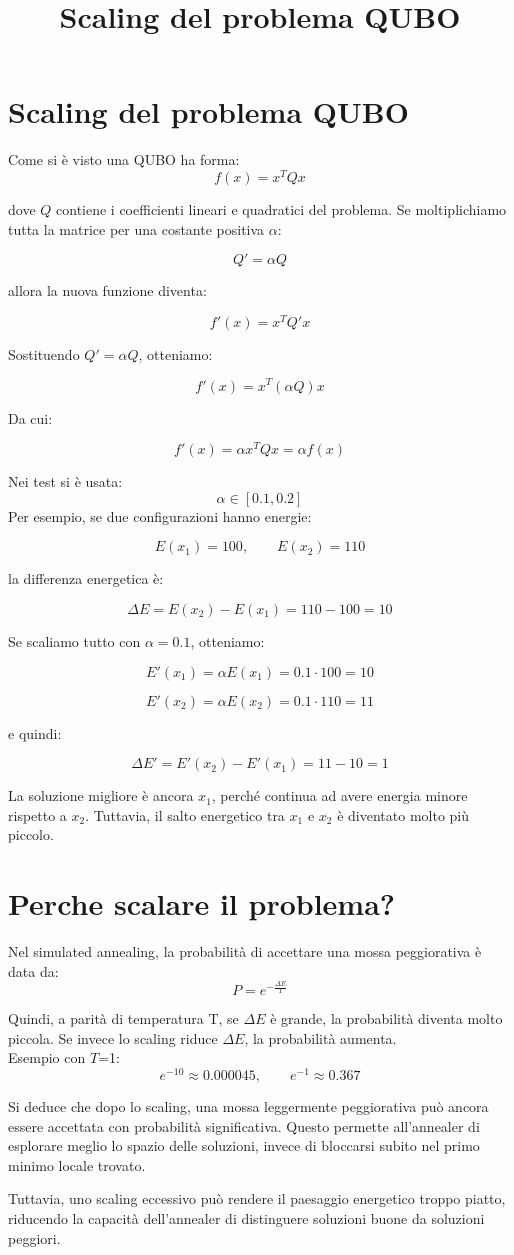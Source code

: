 \documentclass[a4paper,12pt]{article}
\title{Scaling del problema QUBO}
\author{}
\begin{document}
\maketitle
\newpage

\section{Scaling del problema QUBO}
Come si è visto una QUBO ha forma:
\[
f(x) = x^T Q x
\]

dove \(Q\) contiene i coefficienti lineari e quadratici del problema.  
Se moltiplichiamo tutta la matrice per una costante positiva \(\alpha\):

\[
Q' = \alpha Q
\]

allora la nuova funzione diventa:

\[
f'(x) = x^T Q' x
\]

Sostituendo \(Q' = \alpha Q\), otteniamo:

\[
f'(x) = x^T (\alpha Q) x
\]

Da cui:

\[
f'(x) = \alpha x^T Q x = \alpha f(x)
\]

Nei test si è usata: 
\[
\alpha \in [0.1, 0.2]
\]
\[\]
Per esempio, se due configurazioni hanno energie:

\[
E(x_1) = 100, \qquad E(x_2) = 110
\]

la differenza energetica è:

\[
\Delta E = E(x_2) - E(x_1) = 110 - 100 = 10
\]

Se scaliamo tutto con \(\alpha = 0.1\), otteniamo:

\[
E'(x_1) = \alpha E(x_1) = 0.1 \cdot 100 = 10
\]

\[
E'(x_2) = \alpha E(x_2) = 0.1 \cdot 110 = 11
\]

e quindi:

\[
\Delta E' = E'(x_2) - E'(x_1) = 11 - 10 = 1
\]

La soluzione migliore è ancora \(x_1\), perché continua ad avere energia minore 
rispetto a \(x_2\). Tuttavia, il salto energetico tra \(x_1\) e \(x_2\) è diventato 
molto più piccolo.

\section{Perche scalare il problema?}
Nel simulated annealing, la probabilità di accettare una mossa peggiorativa è data da:
\[
P = e^{-\frac{\Delta E}{T}}
\]

Quindi, a parità di temperatura T, se $\Delta E$ è grande, la probabilità diventa molto piccola. 
Se invece lo scaling riduce $\Delta E$, la probabilità aumenta.
\\Esempio con $T$=1:
\[
e^{-10} \approx 0.000045, \qquad e^{-1} \approx 0.367
\]

Si deduce che dopo lo scaling, una mossa leggermente peggiorativa può ancora essere accettata 
con probabilità significativa. Questo permette all’annealer di esplorare meglio lo 
spazio delle soluzioni, invece di bloccarsi subito nel primo minimo locale trovato.

Tuttavia, uno scaling eccessivo può rendere il paesaggio energetico troppo piatto, riducendo la 
capacità dell'annealer di distinguere soluzioni buone da soluzioni peggiori.
\end{document}
